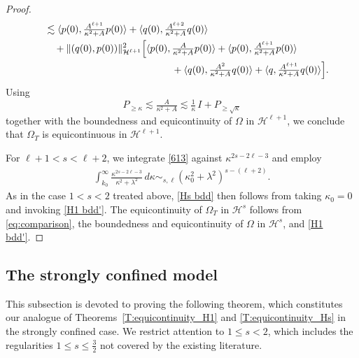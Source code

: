 \documentclass{amsart}
\theoremstyle{definition}
\numberwithin{equation}{section}
\renewcommand{\H}{\mathcal H}
\newcommand{\la}{\langle}
\newcommand{\ra}{\rangle}
\begin{document}
\begin{proof}
\begin{align}
&\quad\lesssim\la p(0), \tfrac{A^{\ell+1}}{\kappa^2+A}p(0)\ra + \la q(0),\tfrac{A^{\ell+2}}{\kappa^2+A}q(0)\ra\notag\\
&\qquad +\|(q(0),p(0))\|_{\H^{\ell+1}}^2\Bigl[\la p(0),\tfrac{A}{\kappa^2+A}p(0)\ra + \la p(0),\tfrac{A^{\ell+1}}{\kappa^2+A}p(0)\ra\\
&\qquad\qquad\qquad \qquad\qquad\qquad \qquad+ \la q(0),\tfrac{A^{2}}{\kappa^2+A}q(0)\ra + \la q,\tfrac{A^{\ell+1}}{\kappa^2+A}q(0)\ra\Bigr].\notag
\end{align}
Using
\begin{equation}\label{eq:comparison}
P_{\geq \kappa} \lesssim \tfrac{A}{\kappa^2 + A} \lesssim \tfrac1\kappa \,I + P_{\geq \sqrt \kappa}
\end{equation}
together with the boundedness and equicontinuity of $\Omega$ in $\H^{\ell+1}$, we conclude that $\Omega_T$ is equicontinuous in $\H^{\ell+1}$.

For $\ell+1<s<\ell+2$, we integrate \eqref{613} against $\kappa^{2s-2\ell-3}$ and employ
\begin{align*}
\int_{k_0}^{\infty} \frac{\kappa^{2s-2\ell-3}}{\kappa^2 + \lambda^2} \,d\kappa\sim_{s,\ell} (\kappa_0^2+\lambda^2)^{s-(\ell+2)}.
\end{align*}
As in the case $1<s<2$ treated above, \eqref{Hs bdd} then follows from taking $\kappa_0=0$ and invoking \eqref{H1 bdd'}. The equicontinuity of $\Omega_T$ in $\H^s$ follows from \eqref{eq:comparison}, the boundedness and equicontinuity of $\Omega$ in $\H^s$, and \eqref{H1 bdd'}.
\end{proof}




\subsection{The strongly confined model}\label{SS:4.1}

This subsection is devoted to proving the following theorem, which constitutes our analogue of Theorems~\ref{T:equicontinuity_H1} and \ref{T:equicontinuity_Hs} in the strongly confined case. We restrict attention to $1\leq s<2$, which includes the regularities $1\leq s\leq \frac32$ not covered by the existing literature.
\end{document}
